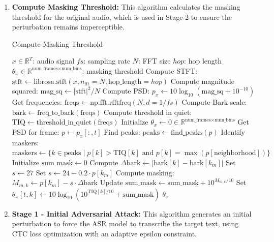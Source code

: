 \documentclass[../main.tex]{subfiles}
\begin{document}
\begin{enumerate}
    \item \textbf{Compute Masking Threshold:} This algorithm calculates the masking threshold for the original audio, which is used in Stage 2 to ensure the perturbation remains imperceptible.
    \begin{breakablealgorithm}{Compute Masking Threshold}
\begin{algorithmic}[1]
\Require
    \State $x \in \mathbb{R}^{T}$: audio signal
    \State $fs$: sampling rate
    \State $N$: FFT size
    \State $hop$: hop length
\Ensure $\theta_x \in \mathbb{R}^{\text{num\_frames} \times \text{num\_bins}}$: masking threshold
\State Compute STFT: $\text{stft} \gets \text{librosa.stft}(x, n_{\text{fft}}=N, \text{hop\_length}=hop)$
\State Compute magnitude squared: $\text{mag\_sq} \gets |\text{stft}|^2 / N$
\State Compute PSD: $p_x \gets 10 \log_{10}(\text{mag\_sq} + 10^{-10})$
\State Get frequencies: $\text{freqs} \gets \text{np.fft.rfftfreq}(N, d=1/fs)$
\State Compute Bark scale: $\text{bark} \gets \text{freq\_to\_bark}(\text{freqs})$
\State Compute threshold in quiet: $\text{TIQ} \gets \text{threshold\_in\_quiet}(\text{freqs})$
\State Initialize $\theta_x \gets 0 \in \mathbb{R}^{\text{num\_frames} \times \text{num\_bins}}$
    \State Get PSD for frame: $p \gets p_x[:, t]$
    \State Find peaks: $\text{peaks} \gets \text{find\_peaks}(p)$
    \State Identify maskers: $\text{maskers} \gets \{k \in \text{peaks} \mid p[k] > \text{TIQ}[k] \text{ and } p[k] = \max(p[\text{neighborhood}])\}$
        \State Initialize $\text{sum\_mask} \gets 0$
            \State Compute $\Delta \text{bark} \gets |\text{bark}[k] - \text{bark}[k_m]|$
                \State Set $s \gets 27$
            \Else
                \State Set $s \gets 24 - 0.2 \cdot p[k_m]$
            \EndIf
            \State Compute masking: $M_{m,k} \gets p[k_m] - s \cdot \Delta \text{bark}$
            \State Update $\text{sum\_mask} \gets \text{sum\_mask} + 10^{M_{m,k} / 10}$
        \EndFor
        \State Set $\theta_x[t, k] \gets 10 \log_{10}(10^{\text{TIQ}[k] / 10} + \text{sum\_mask})$
    \EndFor
\EndFor
\State \Return $\theta_x$
\end{algorithmic}
\end{breakablealgorithm}

\item \textbf{Stage 1 - Initial Adversarial Attack:} This algorithm generates an initial perturbation to force the ASR model to transcribe the target text, using CTC loss optimization with an adaptive epsilon constraint.


\end{enumerate}
\end{document}

